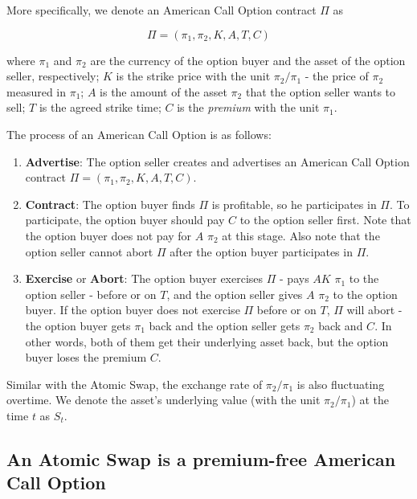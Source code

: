 More specifically, we denote an American Call Option contract $\Pi$ as

$$\Pi = (\pi_1, \pi_2, K, A, T, C)$$

where
$\pi_1$ and $\pi_2$ are the currency of the option buyer and the asset of the option seller, respectively; 
$K$ is the strike price with the unit $\pi_2 / \pi_1$ - the price of $\pi_2$ measured in $\pi_1$;
$A$ is the amount of the asset $\pi_2$ that the option seller wants to sell;
$T$ is the agreed strike time;
$C$ is the \textit{premium} with the unit $\pi_1$.

The process of an American Call Option is as follows:

\begin{enumerate}
    \item \textbf{Advertise}: The option seller creates and advertises an American Call Option contract $\Pi = (\pi_1, \pi_2, K, A, T, C)$.
    \item \textbf{Contract}: The option buyer finds $\Pi$ is profitable, so he participates in $\Pi$.
    To participate, the option buyer should pay $C$ to the option seller first.
    Note that the option buyer does not pay for $A$ $\pi_2$ at this stage.
    Also note that the option seller cannot abort $\Pi$ after the option buyer participates in $\Pi$.
    \item \textbf{Exercise} or \textbf{Abort}: The option buyer exercises $\Pi$ - pays $AK$ $\pi_1$ to the option seller - before or on $T$, and the option seller gives $A$ $\pi_2$ to the option buyer.
    If the option buyer does not exercise $\Pi$ before or on $T$, $\Pi$ will abort - the option buyer gets $\pi_1$ back and the option seller gets $\pi_2$ back and $C$. In other words, both of them get their underlying asset back, but the option buyer loses the premium $C$.
\end{enumerate}

Similar with the Atomic Swap, the exchange rate of $\pi_2 / \pi_1$ is also fluctuating overtime.
We denote the asset's underlying value (with the unit $\pi_2 / \pi_1$) at the time $t$ as $S_t$.












\subsection{An Atomic Swap is a premium-free American Call Option}

